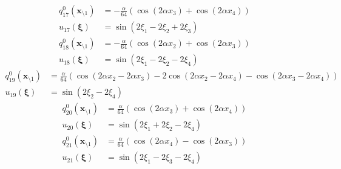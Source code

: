 \documentclass[11pt]{jfm}
\numberwithin{equation}{section}
\begin{document}
\vspace{-0.4cm}
\begin{subequations}
\label{A20}
\begin{align}
q_{17}^0(\boldsymbol{x}_{\setminus 1})&=-\frac{\alpha}{64}  (\cos (2 \alpha  x_3)+\cos (2 \alpha  x_4))
\label{A20a} \\
u_{17}(\boldsymbol{\xi})&=\sin (2 \xi_1-2 \xi_2+2 \xi_3)
\label{A20b}
\end{align}\end{subequations}
\vspace{-0.4cm}
\begin{subequations}
\label{A21}
\begin{align}
q_{18}^0(\boldsymbol{x}_{\setminus 1})&=-\frac{\alpha}{64}   (\cos (2 \alpha  x_2)+\cos (2 \alpha  x_3))
\label{A21a} \\
u_{18}(\boldsymbol{\xi})&=\sin (2 \xi_1-2 \xi_2-2 \xi_4)
\label{A21b}
\end{align}\end{subequations}
\vspace{-0.4cm}
\begin{subequations}
\label{A22}
\begin{align}
q_{19}^0(\boldsymbol{x}_{\setminus 1})&=\frac{\alpha}{64}   (\cos (2 \alpha  x_2-2 \alpha  x_3)-2 \cos (2 \alpha  x_2-2 \alpha  x_4)-\cos (2 \alpha  x_3-2 \alpha  x_4))
\label{A22a} \\
u_{19}(\boldsymbol{\xi})&=\sin (2 \xi_2-2 \xi_4)
\label{A22b}
\end{align}\end{subequations}
\vspace{-0.4cm}
\begin{subequations}
\label{A23}
\begin{align}
q_{20}^0(\boldsymbol{x}_{\setminus 1})&=\frac{\alpha}{64}   (\cos (2 \alpha  x_3)+\cos (2 \alpha  x_4))
\label{A23a} \\
u_{20}(\boldsymbol{\xi})&=\sin (2 \xi_1+2 \xi_2-2 \xi_4)
\label{A23b}
\end{align}\end{subequations}
\vspace{-0.4cm}
\begin{subequations}
\label{A24}
\begin{align}
q_{21}^0(\boldsymbol{x}_{\setminus 1})&=\frac{\alpha}{64}   (\cos (2 \alpha  x_4)-\cos (2 \alpha  x_3))
\label{A24a} \\
u_{21}(\boldsymbol{\xi})&=\sin (2 \xi_1-2 \xi_3-2 \xi_4)
\label{A24b}
\end{align}\end{subequations}
\end{document}
